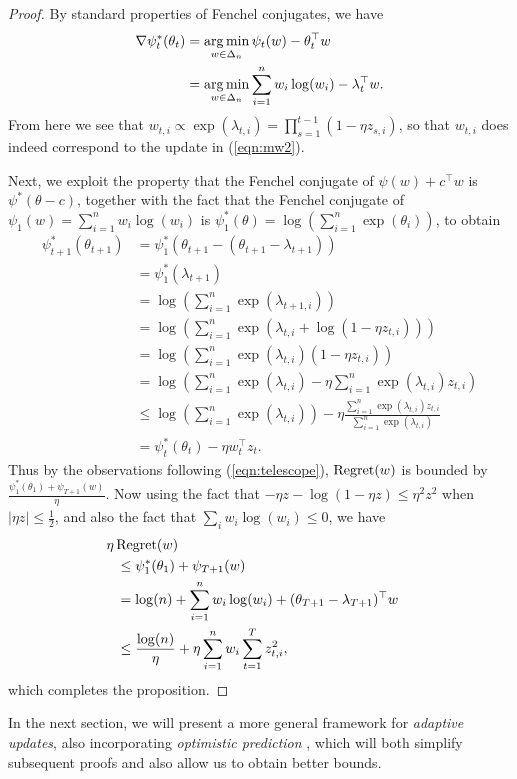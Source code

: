 \documentclass[paper_icml.tex]{subfiles}
\begin{document}
\begin{proof}
By standard properties of Fenchel conjugates, we have
\begin{align}
\nabla \psi_t^*(\theta_t) &= \argmin_{w \in \Delta_n} \psi_t(w) - \theta_t^{\top}w \\
 &= \argmin_{w \in \Delta_n} \sum_{i=1}^n w_i\log(w_i) - \lambda_t^{\top}w.
\end{align}
From here we see that 
$w_{t,i} \propto \exp(\lambda_{t,i}) = \prod_{s=1}^{t-1} (1-\eta z_{s,i})$, 
so that $w_{t,i}$ does indeed correspond to the update in (\ref{eqn:mw2}). 

Next, we exploit the property that the Fenchel conjugate of $\psi(w) + c^{\top}w$ 
is $\psi^*(\theta - c)$, together with the fact that the Fenchel conjugate of 
$\psi_1(w) = \sum_{i=1}^n w_i\log(w_i)$ is $\psi_1^*(\theta) = \log\left(\sum_{i=1}^n \exp(\theta_i)\right)$, 
to obtain
\begin{align*}
\psi_{t+1}^*(\theta_{t+1}) &= \psi_1^*(\theta_{t+1}-(\theta_{t+1}-\lambda_{t+1})) \\
 &= \psi_1^*(\lambda_{t+1}) \\
 &= \log(\sum_{i=1}^n \exp(\lambda_{t+1,i})) \\
 &= \log(\sum_{i=1}^n \exp(\lambda_{t,i} + \log(1 - \eta z_{t,i}))) \\
 &= \log(\sum_{i=1}^n \exp(\lambda_{t,i})(1 - \eta z_{t,i})) \\
 &= \log(\sum_{i=1}^n \exp(\lambda_{t,i}) - \eta \sum_{i=1}^n \exp(\lambda_{t,i})z_{t,i}) \\
 &\leq \log(\sum_{i=1}^n \exp(\lambda_{t,i})) - \eta \frac{\sum_{i=1}^n \exp(\lambda_{t,i})z_{t,i}}{\sum_{i=1}^n \exp(\lambda_{t,i})} \\
 &= \psi_t^*(\theta_t) - \eta w_t^{\top}z_t.
\end{align*}
Thus by the observations following (\ref{eqn:telescope}), $\operatorname{Regret}(w)$ is bounded by 
$\frac{\psi_1^*(\theta_1) + \psi_{T+1}(w)}{\eta}$. Now using the fact that 
$-\eta z - \log(1-\eta z) \leq \eta^2 z^2$ when $|\eta z| \leq \frac{1}{2}$, and also the 
fact that $\sum_i w_i\log(w_i) \leq 0$, we have
\begin{align*}
\lefteqn{\hskip -0.1in \eta\Regret(w)} \\
\hskip 0.1in &\leq \psi_1^*(\theta_1) + \psi_{T+1}(w) \\
 &= \log(n) + \sum_{i=1}^n w_i\log(w_i) %
    + (\theta_{T+1}-\lambda_{T+1})^{\top}w \\
 &\leq \frac{\log(n)}{\eta} + \eta \sum_{i=1}^n w_i \sum_{t=1}^T z_{t,i}^2,
\end{align*}
which completes the proposition.
\end{proof}
In the next section, we will present a more general framework for \emph{adaptive updates}, 
also incorporating \emph{optimistic prediction} \cite{rakhlin2012}, which will both simplify 
subsequent proofs and also allow us to obtain better bounds.
\end{document}
